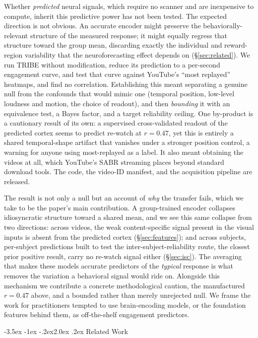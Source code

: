 \documentclass[11pt]{article}
\makeatletter
\renewcommand\section{\@startsection{section}{1}{\z@}%
  {-3.5ex \@plus -1ex \@minus -.2ex}{2.0ex \@plus.2ex}%
  {\normalfont\large\sffamily\bfseries}}
\makeatother
\begin{document}
Whether \emph{predicted} neural signals, which require no scanner and are inexpensive to compute,
inherit this predictive power has not been tested. The expected direction is not obvious. An
accurate encoder might preserve the behaviorally-relevant structure of the measured response; it
might equally regress that structure toward the group mean, discarding exactly the individual and
reward-region variability that the neuroforecasting effect depends on (\S\ref{sec:related}). We run
TRIBE without modification, reduce its prediction to a per-second engagement curve, and test that
curve against YouTube's ``most replayed'' heatmaps, and find no correlation. Establishing this meant
separating a genuine null from the confounds that would mimic one (temporal position, low-level
loudness and motion, the choice of readout), and then \emph{bounding} it with an equivalence test, a
Bayes factor, and a target reliability ceiling. One by-product is a cautionary result of its own: a
supervised cross-validated readout of the predicted cortex seems to predict re-watch at $r=0.47$,
yet this is entirely a shared temporal-shape artifact that vanishes under a stronger position
control, a warning for anyone using most-replayed as a label. It also meant obtaining the videos at all, which
YouTube's SABR streaming places beyond standard download tools. The code, the video-ID manifest, and
the acquisition pipeline are released.

The result is not only a null but an account of \emph{why} the transfer fails, which we take to be
the paper's main contribution. A group-trained encoder collapses idiosyncratic structure toward a
shared mean, and we see this same collapse from two directions: across videos, the weak
content-specific signal present in the visual inputs is absent from the predicted cortex
(\S\ref{sec:features}); and across subjects, per-subject predictions built to test the
inter-subject-reliability route, the closest prior positive result, carry no re-watch signal either
(\S\ref{sec:isc}). The averaging that makes these models accurate predictors of the \emph{typical}
response is what removes the variation a behavioral signal would ride on. Alongside this mechanism we
contribute a concrete methodological caution, the manufactured $r=0.47$ above, and a bounded rather
than merely unrejected null. We frame the work for practitioners tempted to use brain-encoding
models, or the foundation features behind them, as off-the-shelf engagement predictors.

\section{Related Work}\label{sec:related}
\end{document}
